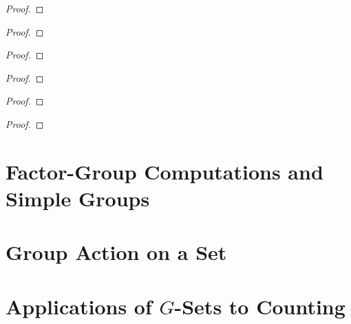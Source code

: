 \newpage
\begin{exercise}
\end{exercise}

\begin{proof}
\end{proof}

\newpage
\begin{exercise}
\end{exercise}

\begin{proof}
\end{proof}

\newpage
\begin{exercise}
\end{exercise}

\begin{proof}
\end{proof}

\newpage
\begin{exercise}
\end{exercise}

\begin{proof}
\end{proof}

\newpage
\begin{exercise}
\end{exercise}

\begin{proof}
\end{proof}

\newpage
\begin{exercise}
\end{exercise}

\begin{proof}
\end{proof}

\newpage
\section{Factor-Group Computations and Simple Groups}


\newpage
\section{Group Action on a Set}


\newpage
\section{Applications of $G$-Sets to Counting}



